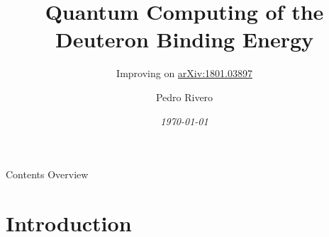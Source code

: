 \documentclass[9pt, handout, aspectratio=169]{beamer}		%
\title{Quantum Computing of the Deuteron Binding Energy}
\subtitle{Improving on \href{https://arxiv.org/abs/1801.03897}{arXiv:1801.03897}}
\author{Pedro Rivero}
\date{\emph{\small{\today}}}
\institute{Argonne National Laboratory\\ Illinois Institute of Technology\\
\href{mailto:\mail}{\nolinkurl{\mail}}}
\begin{document}
\justify
\setlength{\abovedisplayskip}{0pt}
\setlength{\belowdisplayskip}{12pt}
\setlength{\abovedisplayshortskip}{0pt}
\setlength{\belowdisplayshortskip}{12pt}

	\begin{frame}[plain,t]
		\titlepage
	\end{frame}

	\begin{frame}[c]{Contents Overview}
		\tableofcontents
	\end{frame}


\section{Introduction}
\end{document}
